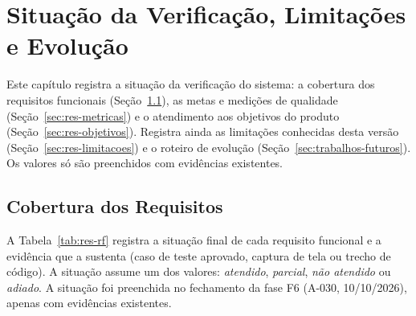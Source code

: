 \chapter{Situação da Verificação, Limitações e Evolução}\label{cap:resultados}

Este capítulo registra a situação da verificação do sistema: a cobertura dos requisitos funcionais (Seção~\ref{sec:res-requisitos}), as metas e medições de qualidade (Seção~\ref{sec:res-metricas}) e o atendimento aos objetivos do produto (Seção~\ref{sec:res-objetivos}). Registra ainda as limitações conhecidas desta versão (Seção~\ref{sec:res-limitacoes}) e o roteiro de evolução (Seção~\ref{sec:trabalhos-futuros}). Os valores só são preenchidos com evidências existentes.

\section{Cobertura dos Requisitos}\label{sec:res-requisitos}

A Tabela~\ref{tab:res-rf} registra a situação final de cada requisito funcional e a evidência que a sustenta (caso de teste aprovado, captura de tela ou trecho de código). A situação assume um dos valores: \emph{atendido}, \emph{parcial}, \emph{não atendido} ou \emph{adiado}. A situação foi preenchida no fechamento da fase F6 (A-030, 10/10/2026), apenas com evidências existentes.

